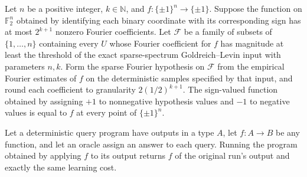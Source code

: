 \begin{theorem}
\label{FABL.roundedDeterministicGoldreichLevinHypothesis_evaluate_eq}
\leanok
{}
Let $n$ be a positive integer, $k\in\mathbb N$, and $f:\{\pm1\}^n\to\{\pm1\}$. Suppose
the function on $\mathbb F_2^n$ obtained by identifying each binary coordinate with its
corresponding sign has at most $2^{k+1}$ nonzero Fourier coefficients. Let $\mathcal F$
be a family of subsets of $\{1,\ldots,n\}$ containing every $U$ whose Fourier
coefficient for $f$ has magnitude at least the threshold of the exact sparse-spectrum
Goldreich–Levin input with parameters $n,k$. Form the sparse Fourier hypothesis on
$\mathcal F$ from the empirical Fourier estimates of $f$ on the deterministic samples
specified by that input, and round each coefficient to granularity $2(1/2)^{k+1}$. The
sign-valued function obtained by assigning $+1$ to nonnegative hypothesis values and
$-1$ to negative values is equal to $f$ at every point of $\{\pm1\}^n$.
\end{theorem}

\begin{theorem}
\label{FABL.DeterministicQueryProgram.runWithCost_map}
\leanok
{}
Let a deterministic query program have outputs in a type $A$, let $f:A\to B$ be any
function, and let an oracle assign an answer to each query. Running the program obtained
by applying $f$ to its output returns $f$ of the original run's output and exactly the
same learning cost.
\end{theorem}

